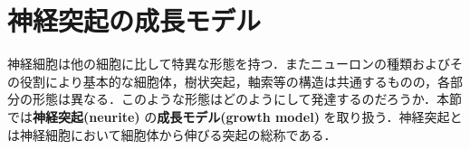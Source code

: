 \section{神経突起の成長モデル}神経細胞は他の細胞に比して特異な形態を持つ．またニューロンの種類およびその役割により基本的な細胞体，樹状突起，軸索等の構造は共通するものの，各部分の形態は異なる．このような形態はどのようにして発達するのだろうか．本節では\textbf{神経突起(neurite)} の\textbf{成長モデル(growth model)} を取り扱う．神経突起とは神経細胞において細胞体から伸びる突起の総称である．